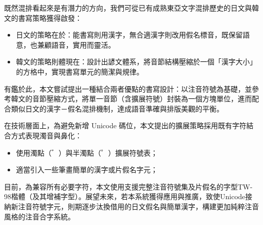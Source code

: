 既然混排看起來是有潛力的方向，我們可從已有成熟東亞文字混排歷史的日文與韓文的書寫策略獲得啟發：
\begin{itemize}
	\item 日文的策略在於：能書寫則用漢字，無合適漢字則改用假名標音，既保留語意，也兼顧語音，實用而靈活。
	\item 韓文的策略則體現在：設計出諺文體系，將音節結構壓縮於一個「漢字大小」的方格中，實現書寫單元的簡潔與規律。
\end{itemize}

有鑑於此，本文嘗試提出一種結合兩者優點的書寫設計：以注音符號為基礎，並參考韓文的音節壓縮方式，將單一音節（含擴展符號）封裝為一個方塊單位，進而配合類似日文的漢字－假名混排機制，達成語音準確與排版美觀的平衡。\par

在技術層面上，為避免新增 Unicode 碼位，本文提出的擴展策略採用既有字符結合方式表現濁音與鼻化：
\begin{itemize}
	\item 使用濁點（゛）與半濁點（゜）擴展符號表；
	\item 適當引入一些筆畫簡單的漢字或片假名字元；
\end{itemize}
目前，為兼容所有必要字符，本文使用支援完整注音符號集及片假名的字型TW-98楷體（及其增補字型）。展望未來，若本系統獲得應用與推廣，致使Unicode接納新注音符號字元，則期逐步汰換借用的日文假名與簡單漢字，構建更加純粹注音風格的注音合字系統。\par
\clearpage